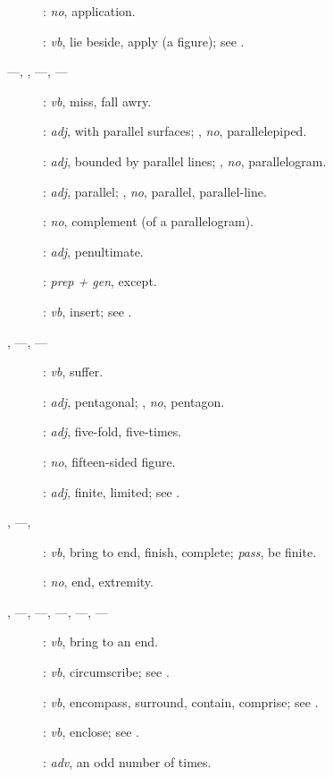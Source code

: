 {\begin{description}
\item[]: {\em no}, application.
\item[]: {\em vb}, lie beside, apply (a figure); see .
\item[  ---, , ---, ---]: {\em vb}, miss, fall awry.
\item[]: {\em adj}, with parallel surfaces; , {\em no}, parallelepiped.
\item[]: {\em adj}, bounded by parallel
lines; , {\em no}, parallelogram.
\item[]: {\em adj}, parallel; , {\em no},
parallel, parallel-line.
\item[]: {\em no}, complement (of a parallelogram).
\item[]: {\em adj}, penultimate.
\item[]: {\em prep + gen}, except.
\item[]: {\em vb}, insert; see .
\item[, ---, ---]: {\em vb}, suffer.
\item[]: {\em adj}, pentagonal; ,
{\em no}, pentagon.
\item[]: {\em adj}, five-fold, five-times.
\item[]: {\em no}, fifteen-sided figure.
\item[]: {\em adj}, finite, limited; see \-.
\item[, ---, ]: {\em vb}, bring to end, finish, complete; {\em pass},  be finite.
\item[]: {\em no}, end, extremity.
\item[, ---, ---, ---, ---, ---]: {\em vb}, bring to an end.
\item[]: {\em vb}, circumscribe; see .
\item[]: {\em vb},
encompass, surround, contain, comprise; see .
\item[]: {\em vb}, enclose; see .
\item[]: {\em adv}, an odd number of times.

\end{description}}
